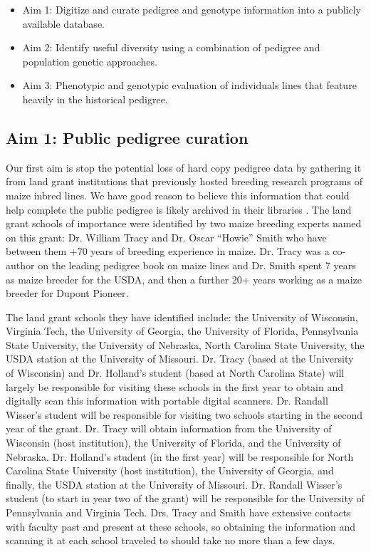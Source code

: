 \documentclass[12pt]{article}
\begin{document}
\begin{itemize}
\item Aim 1: Digitize and curate pedigree and genotype information into a publicly available database. 
\item Aim 2: Identify useful diversity using a combination of pedigree and population genetic approaches.
\item Aim 3: Phenotypic and genotypic evaluation of individuals lines that feature heavily in the historical pedigree.
\end{itemize}

\subsection*{Aim 1: Public pedigree curation}
Our first aim is  stop the potential loss of hard copy pedigree data by gathering it from land grant institutions that previously hosted breeding research programs of maize inbred lines. 
We have good reason to believe this information that could help complete the public pedigree is likely archived in their libraries . 
The land grant schools of importance were identified by two maize breeding experts named on this grant: Dr. William Tracy and Dr. Oscar ``Howie'' Smith who have between them +70 years of breeding experience in maize. 
Dr. Tracy was a co-author on the leading pedigree book on maize lines \cite{gerdes1993compilation} and Dr. Smith spent 7 years as maize breeder for the USDA, and then a further 20+ years working as a maize breeder for Dupont Pioneer.

The land grant schools they have identified include: the University of Wisconsin, Virginia Tech, the University of Georgia, the University of Florida, Pennsylvania State University, the University of Nebraska, North Carolina State University, the USDA station at the University of Missouri. 
Dr. Tracy (based at the University of Wisconsin) and Dr. Holland's student (based at North Carolina State) will largely be responsible for visiting these schools in the first year to obtain and digitally scan this information with portable digital scanners. 
Dr. Randall Wisser's student will be responsible for visiting two schools starting in the second year of the grant.
Dr. Tracy will obtain information from the University of Wisconsin (host institution), the University of Florida, and the University of Nebraska. 
Dr. Holland's student (in the first year) will be responsible for North Carolina State University (host institution), the University of Georgia, and finally, the USDA station at the University of Missouri. 
Dr. Randall Wisser's student (to start in year two of the grant) will be responsible for the University of Pennsylvania and Virginia Tech.
Drs. Tracy and Smith have extensive contacts with faculty past and present at these schools, so obtaining the information and scanning it at each school traveled to should take no more than a few days. 
\end{document}
